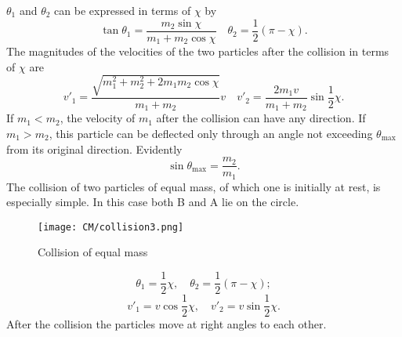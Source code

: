 \noindent
$\theta_1$ and $\theta_2$ can be expressed in terms of $\chi$ by
\[\tan\theta_1 = \frac{m_2\sin\chi}{m_1 + m_2 \cos\chi} \quad \theta_2 = \frac{1}{2}(\pi - \chi).\]
The magnitudes of the velocities of the two particles after the collision in terms of $\chi$ are
\[v'_1 = \frac{\sqrt{m_1^2 + m_2^2 + 2m_1m_2\cos\chi}}{m_1+m_2}v \quad v'_2 = \frac{2m_1v}{m_1+m_2}\sin\frac{1}{2}\chi.\]
If $m_1 < m_2$, the velocity of $m_1$ after the collision can have any direction.
If $m_1 > m_2$, this particle can be deflected only through an angle not exceeding $\theta_\mathrm{max}$ from its original direction. Evidently
\[\sin\theta_{\mathrm{max}} = \frac{m_2}{m_1}.\]
The collision of two particles of equal mass, of which one is initially at rest, is especially simple. In this case both B and A lie on the circle.
\begin{figure}[!h]
	\centering
	\texttt{[image: CM/collision3.png]}
	\caption{Collision of equal mass}
\end{figure}
\[\theta_1 = \frac{1}{2}\chi ,\quad \theta_2 = \frac{1}{2}(\pi-\chi);\]
\[v'_1 = v\cos\frac{1}{2}\chi ,\quad v'_2 = v\sin\frac{1}{2}\chi.\]
After the collision the particles move at right angles to each other.

